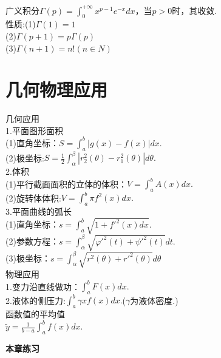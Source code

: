 \documentclass[UTF8]{ctexart}
\begin{document}
\\广义积分$\displaystyle{\varGamma(p)=\int _0^{+\infty} x^{p-1} e^{-x}dx}$，当$p>0$时，其收敛.
\\性质:(1)$\displaystyle{\varGamma(1)=1}$
\\(2)$\displaystyle{\varGamma(p+1)=p\varGamma(p)}$
\\(3)$\displaystyle{\varGamma(n+1)=n!(n\in N)}$
\vspace{-8mm} \section{几何物理应用}几何应用
\\1.平面图形面积
\\(1)直角坐标：$S=\displaystyle{\int_a^b |g(x)-f(x)|dx.}$
\\(2)极坐标:$S=\displaystyle{\frac{1}{2}\int_\alpha^\beta |r_2^2(\theta)-r_1^2(\theta)|d\theta}.$
\\2.体积
\\(1)平行截面面积的立体的体积：$\displaystyle{V=\int_a^b A(x)dx.}$
\\(2)旋转体体积:$\displaystyle{V=\int_a^b \pi f^2(x)dx.}$
\\3.平面曲线的弧长
\\(1)直角坐标：$\displaystyle{s=\int_a^b \sqrt{1+f'^2(x)dx}.}$
\\(2)参数方程：$\displaystyle{s=\int_\alpha^\beta \sqrt{\varphi'^2(t)+\psi'^2(t)}dt}.$
\\(3)极坐标：$\displaystyle{s=\int_\alpha^\beta \sqrt{r^2(\theta)+r'^2(\theta)}d\theta}$
\\物理应用
\\1.变力沿直线做功：$\displaystyle{\int_a^b F(x)dx.}$
\\2.液体的侧压力:$\displaystyle{\int_a^b \gamma xf(x)dx.}$($\gamma$为液体密度.)
\\函数值的平均值
\\$\displaystyle{\tilde{y}=\frac{1}{b-a} \int_a^b f(x)dx.}$

\centerline{\textbf{本章练习}}
\end{document}
